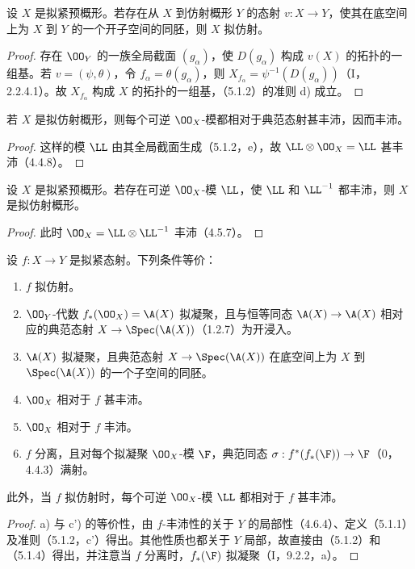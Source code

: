 设 $X$ 是拟紧预概形。若存在从 $X$ 到仿射概形 $Y$ 的态射 $v:X\to Y$，使其在底空间上为 $X$ 到 $Y$ 的一个开子空间的同胚，则 $X$ 拟仿射。
\begin{proof}
存在 $\OO_Y$ 的一族全局截面 $(g_\alpha)$，使 $D(g_\alpha)$ 构成 $v(X)$ 的拓扑的一组基。若 $v=(\psi,\theta)$，令 $f_\alpha=\theta(g_\alpha)$，则
$X_{f_\alpha}=\psi^{-1}(D(g_\alpha))$（I，2.2.4.1）。故 $X_{f_\alpha}$ 构成 $X$ 的拓扑的一组基，（5.1.2）的准则 d) 成立。
\end{proof}

若 $X$ 是拟仿射概形，则每个可逆 $\OO_X$-模都相对于典范态射甚丰沛，因而丰沛。
\begin{proof}
这样的模 $\LL$ 由其全局截面生成（5.1.2，e），故 $\LL\otimes\OO_X=\LL$ 甚丰沛（4.4.8）。
\end{proof}

设 $X$ 是拟紧预概形。若存在可逆 $\OO_X$-模 $\LL$，使 $\LL$ 和 $\LL^{-1}$ 都丰沛，则 $X$ 是拟仿射概形。
\begin{proof}
此时 $\OO_X=\LL\otimes\LL^{-1}$ 丰沛（4.5.7）。
\end{proof}

设 $f:X\to Y$ 是拟紧态射。下列条件等价：
\begin{enumerate}[label=\textup{a)}]
\item $f$ 拟仿射。
\item[\textup{b)}] $\OO_Y$-代数 $f_*(\OO_X)=\A(X)$ 拟凝聚，且与恒等同态 $\A(X)\to\A(X)$ 相对应的典范态射 $X\to\Spec(\A(X))$（1.2.7）为开浸入。
\item[\textup{b')}] $\A(X)$ 拟凝聚，且典范态射 $X\to\Spec(\A(X))$ 在底空间上为 $X$ 到 $\Spec(\A(X))$ 的一个子空间的同胚。
\item[\textup{c)}] $\OO_X$ 相对于 $f$ 甚丰沛。
\item[\textup{c')}] $\OO_X$ 相对于 $f$ 丰沛。
\item[\textup{d)}] $f$ 分离，且对每个拟凝聚 $\OO_X$-模 $\F$，典范同态
$\sigma:f^*(f_*(\F))\to\F$（0，4.4.3）满射。
\end{enumerate}
此外，当 $f$ 拟仿射时，每个可逆 $\OO_X$-模 $\LL$ 都相对于 $f$ 甚丰沛。
\begin{proof}
a) 与 c') 的等价性，由 $f$-丰沛性的关于 $Y$ 的局部性（4.6.4）、定义（5.1.1）及准则（5.1.2，c'）得出。其他性质也都关于 $Y$ 局部，故直接由（5.1.2）和（5.1.4）得出，并注意当 $f$ 分离时，$f_*(\F)$ 拟凝聚（I，9.2.2，a）。
\end{proof}

